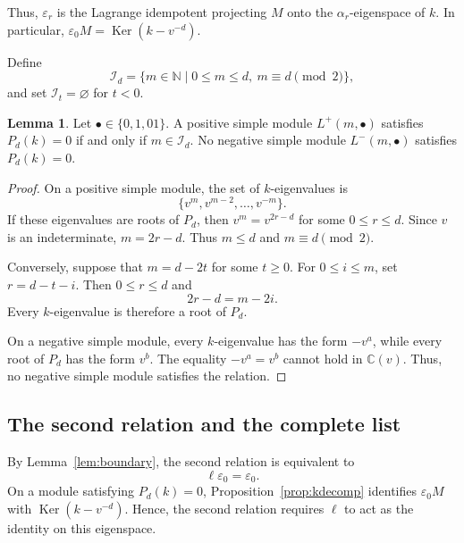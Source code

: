 \documentclass[12pt]{amsart}
\numberwithin{equation}{section}
\theoremstyle{definition}
\newtheorem{lemma}[theorem]{Lemma}
\theoremstyle{definition}
\newcommand{\eps}{\varepsilon}
\newcommand{\Ker}{\operatorname{Ker}}
\newcommand{\Iset}{\mathcal I}
\begin{document}
Thus, $\eps_r$ is the Lagrange idempotent projecting $M$ onto the $\alpha_r$-eigenspace of $k$. In particular, $\eps_0M=\Ker(k-v^{-d})$.

Define
\begin{equation}\label{eq:calId}
    \Iset_d=
\{m\in\mathbb N\mid0\le m\le d,\ m\equiv d\pmod2\},
\end{equation}
and set $\Iset_t=\varnothing$ for $t<0$.


\begin{lemma}\label{lem:cartanmodules}
Let $\bullet\in \{0,1,01\}$. 
A positive simple module $L^+(m,\bullet)$ satisfies $P_d(k)=0$ if and only if $m\in\Iset_d$. No negative simple module $L^-(m,\bullet)$ satisfies $P_d(k)=0$.
\end{lemma}

\begin{proof}
On a positive simple module, the set of $k$-eigenvalues is
$$
\{v^m,v^{m-2},\ldots,v^{-m}\}.
$$
If these eigenvalues are roots of $P_d$, then $v^m=v^{2r-d}$ for some $0\le r\le d$. Since $v$ is an indeterminate, $m=2r-d$. Thus $m\le d$ and $m\equiv d\pmod2$.

Conversely, suppose that $m=d-2t$ for some $t\ge0$. For $0\le i\le m$, set $r=d-t-i$. Then $0\le r\le d$ and
$$
2r-d=m-2i.
$$
Every $k$-eigenvalue is therefore a root of $P_d$.

On a negative simple module, every $k$-eigenvalue has the form $-v^a$, while every root of $P_d$ has the form $v^b$. The equality $-v^a=v^b$ cannot hold in $\mathbb C(v)$. Thus, no negative simple module satisfies the relation.
\end{proof}

\subsection{The second relation and the complete list}\label{subsec:boundarysimple}

By Lemma~\ref{lem:boundary}, the second relation is equivalent to
$$
\ell\eps_0=\eps_0.
$$
On a module satisfying $P_d(k)=0$, 
Proposition~\ref{prop:kdecomp} identifies $\eps_0M$ with $\Ker(k-v^{-d})$. Hence, the second relation requires $\ell$ to act as the identity on this eigenspace.
\end{document}
